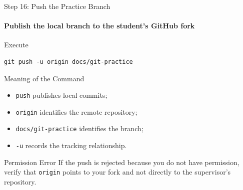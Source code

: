 \begin{frame}[fragile]{Step 16: Push the Practice Branch}
\framesubtitle{Publish the local branch to the student's GitHub fork}

\footnotesize

\begin{block}{Execute}
\begin{verbatim}
git push -u origin docs/git-practice
\end{verbatim}
\end{block}

\begin{exampleblock}{Meaning of the Command}
\begin{itemize}
    \setlength{\itemsep}{0.18em}
    \item \texttt{push} publishes local commits;
    \item \texttt{origin} identifies the remote repository;
    \item \texttt{docs/git-practice} identifies the branch;
    \item \texttt{-u} records the tracking relationship.
\end{itemize}
\end{exampleblock}

\begin{alertblock}{Permission Error}
If the push is rejected because you do not have permission, verify that
\texttt{origin} points to your fork and not directly to the supervisor's
repository.
\end{alertblock}

\end{frame}


